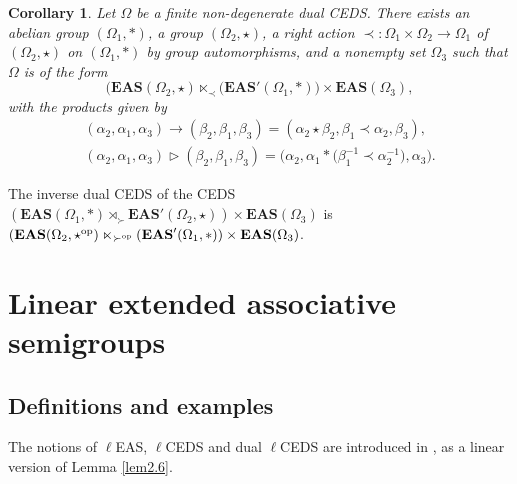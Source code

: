 \documentclass[pdftex]{sigma}
\numberwithin{equation}{section}
\newtheorem{Corollary}[Theorem]{Corollary}
\newcommand{\eas}{\mathbf{EAS}}
\begin{document}
\begin{Corollary}\label{cor3.15}
Let $\Omega$ be a finite non-degenerate dual CEDS. There exists an abelian group $(\Omega_1,*)$, a group $(\Omega_2,\star)$, a right action $\prec\colon\Omega_1\times \Omega_2\longrightarrow \Omega_1$ of $(\Omega_2,\star)$ on $(\Omega_1,*)$ by group automorphisms,
 and a nonempty set $\Omega_3$ such that $\Omega$ is of the form
\[(\eas(\Omega_2,\star) \ltimes_\prec \bigl(\eas'(\Omega_1,*)\bigr)\times \eas(\Omega_3),\]
with the products given by
\begin{gather*}
(\alpha_2,\alpha_1,\alpha_3)\rightarrow(\beta_2,\beta_1,\beta_3) =(\alpha_2\star\beta_2,\beta_1\prec\alpha_2,\beta_3),\\
(\alpha_2,\alpha_1,\alpha_3)\triangleright(\beta_2,\beta_1,\beta_3) =\bigl(\alpha_2,\alpha_1*\bigl(\beta_1^{-1}\prec \alpha_2^{-1}\bigr),\alpha_3\bigr).
\end{gather*} \end{Corollary}

\begin{Remark}
The inverse dual CEDS of the CEDS $(\eas(\Omega_1,*) \rtimes_\succ \eas'(\Omega_2,\star))\times \eas(\Omega_3)$ is $(\eas(\Omega_2,\star^{\rm op}) \ltimes_{\succ^{\rm op}} (\eas'(\Omega_1,*))\times \eas(\Omega_3)$.
\end{Remark}


\section{Linear extended associative semigroups}

\subsection{Definitions and examples}

The notions of $\ell$EAS, $\ell$CEDS and dual $\ell$CEDS are introduced in \cite[Definition 1.5]{Foissy48}, as a linear version of Lemma \ref{lem2.6}.
\end{document}

